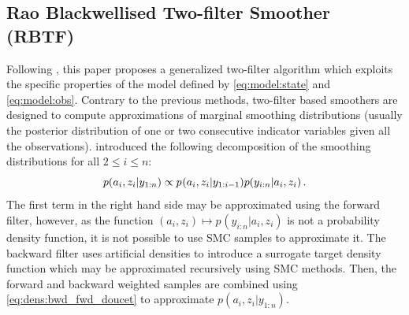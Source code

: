 \subsection{Rao Blackwellised Two-filter Smoother (RBTF)}
Following \cite{briers:doucet:maskell:2010}, this paper proposes a generalized two-filter algorithm which exploits the specific properties of the model defined by \eqref{eq:model:state} and \eqref{eq:model:obs}. Contrary to the previous methods, two-filter based smoothers are designed to compute approximations of marginal smoothing distributions (usually the posterior distribution of one or two consecutive  indicator variables given all the observations). \cite{briers:doucet:maskell:2010} introduced the following decomposition of the smoothing distributions for all $2\le i \le n$:
\begin{equation}
\label{eq:dens:bwd_fwd_doucet}
p(a_{i},z_{i}|y_{1:n})  \propto  p_{}(a_{i},z_{i}|y_{1:i-1})p(y_{i:n}|a_i,z_i)\,.
\end{equation}
The first term in the right hand side may be approximated using the forward filter, however, as the function $(a_{i},z_{i})\mapsto p_{}(y_{i:n}|a_{i},z_{i})$ is not a probability density function, it is not possible to use SMC samples to approximate it. The backward filter uses artificial densities to introduce a surrogate target density function which may be approximated recursively using SMC methods. Then, the forward and backward weighted samples are combined using \eqref{eq:dens:bwd_fwd_doucet} to approximate $p(a_{i},z_{i}|y_{1:n})$. %
